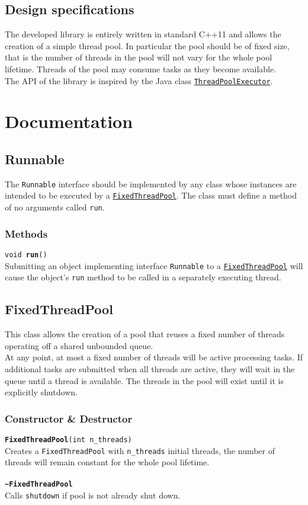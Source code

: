 \documentclass[10pt,twocolumn,letterpaper]{article}
\begin{document}
	\subsection{Design specifications}
	The developed library is entirely written in standard C++11 and allows the creation of a simple thread pool. In particular the pool should be of fixed size, that is the number of threads in the pool will not vary for the whole pool lifetime. Threads of the pool may consume tasks as they become available.\\
	The API of the library is inspired by the Java class \href{https://docs.oracle.com/javase/7/docs/api/java/util/concurrent/ThreadPoolExecutor.html}{\lstinline|ThreadPoolExecutor|}.
	
	\section{Documentation} \label{docs}
	\subsection{Runnable}\label{sec:runnable}
	\noindent
	The \lstinline|Runnable| interface should be implemented by any class whose instances are intended to be executed by a \hyperref[sec:ftp]{\lstinline|FixedThreadPool|}. The class must define a method of no arguments called \lstinline|run|.
	\subsubsection{Methods}
	\texttt{void \textbf{run}()}\\
	Submitting an object implementing interface \lstinline|Runnable| to a \hyperref[ftp]{\lstinline|FixedThreadPool|} will cause the object's \lstinline|run| method to be called in a separately executing thread.
	
	\subsection{FixedThreadPool}\label{sec:ftp}
	\noindent
	This class allows the creation of a pool that reuses a fixed number of threads operating off a shared unbounded queue.\\
	At any point, at most a fixed number of threads will be active processing tasks.
	If additional tasks are submitted when all threads are active, they will wait in the queue until a thread is available.
	The threads in the pool will exist until it is explicitly shutdown.
	\subsubsection{Constructor \& Destructor}
	\texttt{\textbf{FixedThreadPool}(int n\_threads)}\\
	Creates a \lstinline|FixedThreadPool| with \lstinline|n_threads| initial threads, the number of threads will remain constant for the whole pool lifetime.\\\\
	\texttt{\textbf{\textasciitilde FixedThreadPool}}\\
	Calls \texttt{shutdown} if pool is not already shut down.
\end{document}
